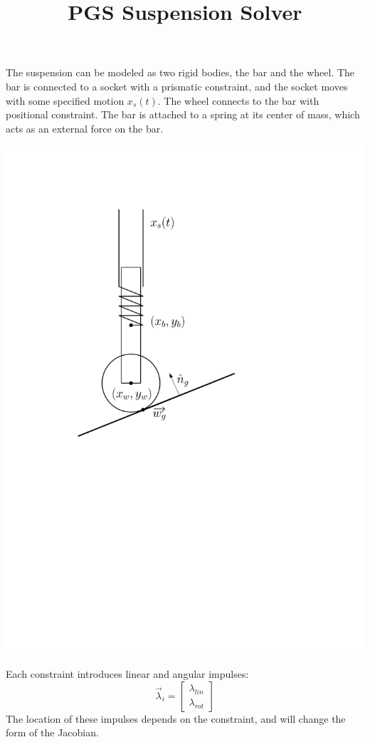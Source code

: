 \documentclass[9pt]{article}
\title{PGS Suspension Solver}
\begin{document}
\maketitle

The suspension can be modeled as two rigid bodies, the bar and the wheel. The bar is connected to a socket with a prismatic constraint, and the socket moves with some specified motion $x_s(t)$. The wheel connects to the bar with positional constraint. The bar is attached to a spring at its center of mass, which acts as an external force on the bar.

\begin{center}
\includegraphics[scale=0.5]{diagram.pdf}
\end{center}

Each constraint introduces linear and angular impulses:
\[
\overrightarrow{\lambda}_i = 
\left[
\begin{array}{c}
\lambda_{lin} \\
\lambda_{rot}
\end{array} 
\right]
\]
The location of these impulses depends on the constraint, and will change the form of the Jacobian.
\end{document}
